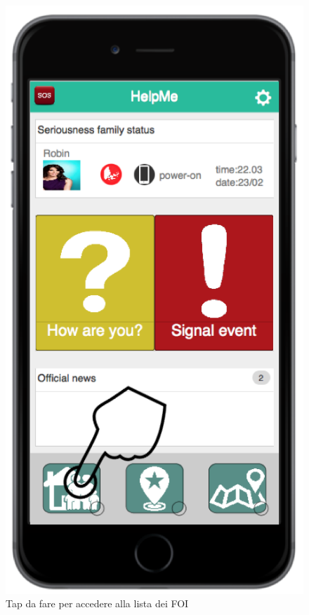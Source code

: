 \begin{itemize}
\begin{figure}[H]
	\centering
	\includegraphics[scale=1]{interfaccia/tapfoi.png}
	\caption{Tap da fare per accedere alla lista dei FOI }
	\label{fig:tapfoi}
\end{figure}
\begin{figure}[H]
	\centering

\end{figure}
\end{itemize}
